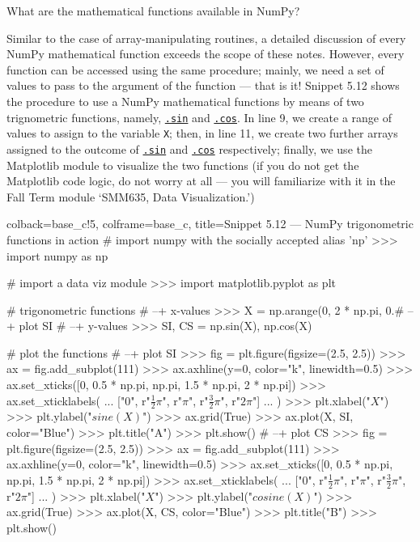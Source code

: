 \documentclass[a4paper,11pt]{book}
\numberwithin{figure}{chapter}
\numberwithin{table}{chapter}
\newcommand{\question}[1]{%
    \begin{tcolorbox}[colback=comp_c!10,colframe=comp_c,sidebyside align=top,width=\linewidth,before skip=1ex]
        #1
    \end{tcolorbox}
    \switchcolumn%
}
\newcommand{\note}[1]{%
    \begin{tcolorbox}[colback=white!0,colframe=white!10,width=\linewidth,before skip=1ex]
        #1
    \end{tcolorbox}
}
\begin{document}
\begin{paracol}{2}
\question{\raggedright What are the mathematical functions available in NumPy?}
\note{
Similar to the case of array-manipulating routines, a detailed discussion of every NumPy mathematical function exceeds the scope of these notes. However, every function can be accessed using the same procedure; mainly, we need a set of values to pass to the argument of the function --- that is it! Snippet 5.12 shows the procedure to use a NumPy mathematical functions by means of two trignometric functions, namely, \href{https://numpy.org/doc/stable/reference/generated/numpy.sin.html\#numpy.sin}{\texttt{.sin}} and \href{https://numpy.org/doc/stable/reference/generated/numpy.cos.html\#numpy.cos}{\texttt{.cos}}. In line 9, we create a range of values to assign to the variable \texttt{X}; then, in line 11, we create two further arrays assigned to the outcome of \href{https://numpy.org/doc/stable/reference/generated/numpy.sin.html\#numpy.sin}{\texttt{.sin}} and \href{https://numpy.org/doc/stable/reference/generated/numpy.cos.html\#numpy.cos}{\texttt{.cos}} respectively; finally, we use the Matplotlib module to visualize the two functions (if you do not get the Matplotlib code logic, do not worry at all --- you will familiarize with it in the Fall Term module `SMM635, Data Visualization.')}
\end{paracol}

\begin{pythoncode}[linenos=true,]{colback=base_c!5, colframe=base_c, title=\sffamily Snippet 5.12 --- NumPy trigonometric functions in action}
# import numpy with the socially accepted alias 'np'
>>> import numpy as np

# import a data viz module
>>> import matplotlib.pyplot as plt

# trigonometric functions
# --+ x-values
>>> X = np.arange(0, 2 * np.pi, 0.# --+ plot SI 
# --+ y-values
>>> SI, CS = np.sin(X), np.cos(X)

# plot the functions
# --+ plot SI 
>>> fig = plt.figure(figsize=(2.5, 2.5))
>>> ax = fig.add_subplot(111)
>>> ax.axhline(y=0, color="k", linewidth=0.5)
>>> ax.set_xticks([0, 0.5 * np.pi, np.pi, 1.5 * np.pi, 2 * np.pi])
>>> ax.set_xticklabels(
...     ["0", r"$\frac{1}{2} \pi$", r"$\pi$", r"$\frac{3}{2} \pi$", r"$2 \pi$"]
... )
>>> plt.xlabel("$X$")
>>> plt.ylabel("$sine(X)$")
>>> ax.grid(True)
>>> ax.plot(X, SI, color="Blue")
>>> plt.title("A")
>>> plt.show() 
# --+ plot CS 
>>> fig = plt.figure(figsize=(2.5, 2.5))
>>> ax = fig.add_subplot(111)
>>> ax.axhline(y=0, color="k", linewidth=0.5)
>>> ax.set_xticks([0, 0.5 * np.pi, np.pi, 1.5 * np.pi, 2 * np.pi])
>>> ax.set_xticklabels(
...     ["0", r"$\frac{1}{2} \pi$", r"$\pi$", r"$\frac{3}{2} \pi$", r"$2 \pi$"]
... )
>>> plt.xlabel("$X$")
>>> plt.ylabel("$cosine(X)$")
>>> ax.grid(True)
>>> ax.plot(X, CS, color="Blue")
>>> plt.title("B")
>>> plt.show()
\end{pythoncode}
\end{document}
